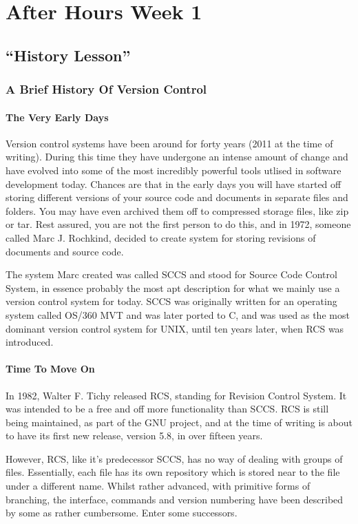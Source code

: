 \chapter{After Hours Week 1}
\section{``History Lesson''}
\subsection{A Brief History Of Version Control}

\subsubsection{The Very Early Days}
Version control systems have been around for forty years (2011 at the time of writing).  During this time they have undergone an intense amount of change and have evolved into some of the most incredibly powerful tools utlised in software development today.  Chances are that in the early days you will have started off storing different versions of your source code and documents in separate files and folders.  You may have even archived them off to compressed storage files, like zip or tar.  Rest assured, you are not the first person to do this, and in 1972, someone called Marc J. Rochkind, decided to create system for storing revisions of documents and source code.

The system Marc created was called SCCS and stood for Source Code Control System, in essence probably the most apt description for what we mainly use a version control system for today.  SCCS was originally written for an operating system called OS/360 MVT and was later ported to C, and was used as the most dominant version control system for UNIX, until ten years later, when RCS was introduced.

\subsubsection{Time To Move On}
In 1982, Walter F. Tichy released RCS, standing for Revision Control System.  It was intended to be a free and off more functionality than SCCS.  RCS is still being maintained, as part of the GNU project, and at the time of writing is about to have its first new release, version 5.8, in over fifteen years.

However, RCS, like it's predecessor SCCS, has no way of dealing with groups of files.  Essentially, each file has its own repository which is stored near to the file under a different name.  Whilst rather advanced, with primitive forms of branching, the interface, commands and version numbering have been described by some as rather cumbersome.  Enter some successors.

